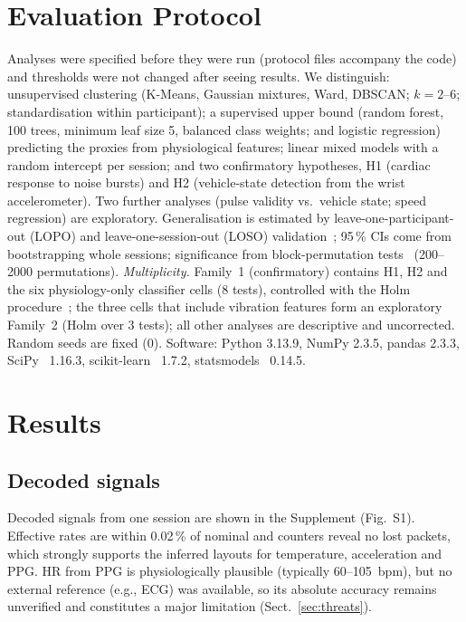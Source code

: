 \documentclass[runningheads]{llncs}
\begin{document}
\section{Evaluation Protocol}
Analyses were specified before they were run (protocol files accompany the code) and thresholds were not changed after seeing results. We distinguish: unsupervised clustering (K-Means, Gaussian mixtures, Ward, DBSCAN; $k=2$--6; standardisation within participant); a supervised upper bound (random forest, 100 trees, minimum leaf size 5, balanced class weights; and logistic regression) predicting the proxies from physiological features; linear mixed models with a random intercept per session; and two confirmatory hypotheses, H1 (cardiac response to noise bursts) and H2 (vehicle-state detection from the wrist accelerometer). Two further analyses (pulse validity vs.\ vehicle state; speed regression) are exploratory. Generalisation is estimated by leave-one-participant-out (LOPO) and leave-one-session-out (LOSO) validation~\cite{gholami2020}; 95\,\% CIs come from bootstrapping whole sessions; significance from block-permutation tests~\cite{ojala2010} (200--2000 permutations). \emph{Multiplicity.} Family~1 (confirmatory) contains H1, H2 and the six physiology-only classifier cells (8 tests), controlled with the Holm procedure~\cite{holm1979}; the three cells that include vibration features form an exploratory Family~2 (Holm over 3 tests); all other analyses are descriptive and uncorrected. Random seeds are fixed (0). Software: Python 3.13.9, NumPy 2.3.5, pandas 2.3.3, SciPy~\cite{virtanen2020} 1.16.3, scikit-learn~\cite{sklearn2011} 1.7.2, statsmodels~\cite{seabold2010} 0.14.5.

\section{Results}
\subsection{Decoded signals}
Decoded signals from one session are shown in the Supplement (Fig.~S1). Effective rates are within 0.02\,\% of nominal and counters reveal no lost packets, which strongly supports the inferred layouts for temperature, acceleration and PPG. HR from PPG is physiologically plausible (typically 60--105~bpm), but no external reference (e.g., ECG) was available, so its absolute accuracy remains unverified and constitutes a major limitation (Sect.~\ref{sec:threats}).
\end{document}
